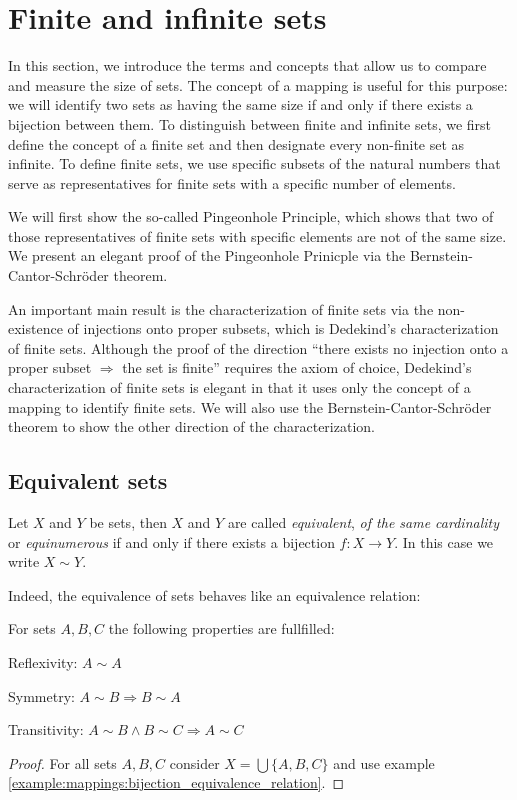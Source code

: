 \section{Finite and infinite sets}

In this section, we introduce the terms and concepts that allow us to compare and measure the size of sets. The concept of a mapping is useful for this purpose: we will identify two sets as having the same size if and only if there exists a bijection between them. To distinguish between finite and infinite sets, we first define the concept of a finite set and then designate every non-finite set as infinite. To define finite sets, we use specific subsets of the natural numbers that serve as representatives for finite sets with a specific number of elements.

We will first show the so-called Pingeonhole Principle, which shows that two of those representatives of finite sets with specific elements are not of the same size. We present an elegant proof of the Pingeonhole Prinicple via the Bernstein-Cantor-Schröder theorem.

An important main result is the characterization of finite sets via the non-existence of injections onto proper subsets, which is Dedekind's characterization of finite sets. Although the proof of the direction \enquote{there exists no injection onto a proper subset $\Rightarrow$ the set is finite} requires the axiom of choice, Dedekind's characterization of finite sets is elegant in that it uses only the concept of a mapping to identify finite sets. We will also use the Bernstein-Cantor-Schröder theorem to show the other direction of the characterization.

\subsection{Equivalent sets}

\begin{definition}
    Let $X$ and $Y$ be sets, then $X$ and $Y$ are called \emph{equivalent}, \emph{of the same cardinality} or \emph{equinumerous} if and only if there exists a bijection $f\colon X\rightarrow Y$. In this case we write $X\sim Y$.
\end{definition}

Indeed, the equivalence of sets behaves like an equivalence relation:

\begin{theorem}\label{satz:finite_infinite:equivalence_relation}
    For sets $A, B, C$ the following properties are fullfilled:
    \begin{intheoremenumerate}
        \item Reflexivity: $A\sim A$
        \item Symmetry: $A\sim B\Rightarrow B\sim A$
        \item Transitivity: $A\sim B\land B\sim C\Rightarrow A\sim C$
    \end{intheoremenumerate}
\end{theorem}
\begin{proof}
    For all sets $A,B,C$ consider $X=\bigcup\{A,B,C\}$ and use example \ref{example:mappings:bijection_equivalence_relation}.
\end{proof}

